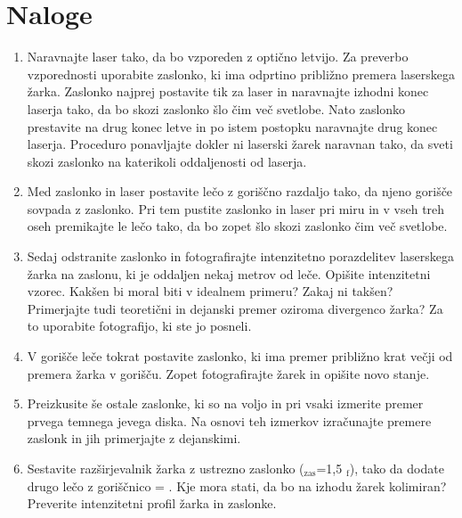 \documentclass[letterpaper,10pt,english]{sphinxmanual}
\begin{document}
\section{Naloge}
\label{\detokenize{prostorskofiltriranje:naloge}}\begin{enumerate}
%
\item {} 
\sphinxAtStartPar
Naravnajte  laser tako, da bo vzporeden z optično letvijo. Za preverbo vzporednosti uporabite zaslonko, ki ima odprtino približno  premera laserskega žarka. Zaslonko najprej postavite tik za laser in naravnajte izhodni konec laserja tako, da bo skozi zaslonko šlo čim več svetlobe. Nato zaslonko prestavite na drug konec letve in po istem postopku naravnajte drug konec laserja. Proceduro ponavljajte dokler ni laserski žarek naravnan tako, da sveti skozi zaslonko na katerikoli oddaljenosti od laserja.

\item {} 
\sphinxAtStartPar
Med zaslonko in laser postavite lečo z goriščno razdaljo  tako, da njeno gorišče sovpada z zaslonko. Pri tem pustite zaslonko in laser pri miru in v vseh treh oseh premikajte le lečo tako, da bo zopet šlo skozi zaslonko čim več svetlobe.

\item {} 
\sphinxAtStartPar
Sedaj odstranite zaslonko in fotografirajte intenzitetno porazdelitev laserskega žarka na zaslonu, ki je oddaljen nekaj metrov od leče. Opišite intenzitetni vzorec. Kakšen bi moral biti v idealnem primeru? Zakaj ni takšen? Primerjajte tudi teoretični in dejanski premer oziroma divergenco žarka? Za to uporabite fotografijo, ki ste jo posneli.

\item {} 
\sphinxAtStartPar
V gorišče leče tokrat postavite zaslonko, ki ima premer približno \sphinxhyphen{}krat večji od premera žarka v gorišču. Zopet fotografirajte žarek in opišite novo stanje.

\item {} 
\sphinxAtStartPar
Preizkusite še ostale zaslonke, ki so na voljo in pri vsaki izmerite premer prvega temnega \sphinxhyphen{}jevega diska. Na osnovi teh izmerkov izračunajte premere zaslonk in jih primerjajte z dejanskimi.

\item {} 
\sphinxAtStartPar
Sestavite razširjevalnik žarka z ustrezno zaslonko ($_{\text{zas}}$=1,5 $_{\text{f}}$), tako da dodate drugo lečo z goriščnico  = \sphinxstyleemphasis{150 mm}. Kje mora stati, da bo na izhodu žarek kolimiran? Preverite intenzitetni profil žarka  in  zaslonke.

\end{enumerate}
\end{document}
